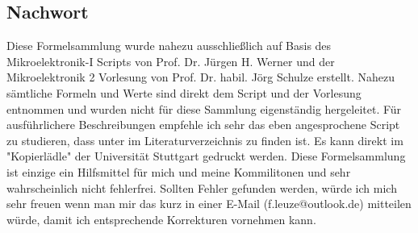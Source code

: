 \documentclass[12pt,a4paper]{article}%
\numberwithin{equation}{section}
\numberwithin{equation}{subsection}
\begin{document}
  \newpage
  \subsection{Nachwort}
  Diese Formelsammlung wurde nahezu ausschließlich auf Basis des Mikroelektronik-I Scripts von Prof. Dr. Jürgen H. Werner und der Mikroelektronik 2 Vorlesung von Prof. Dr. habil. Jörg Schulze erstellt. Nahezu sämtliche Formeln und Werte sind direkt dem Script und der Vorlesung entnommen und wurden nicht für diese Sammlung eigenständig hergeleitet. Für ausführlichere Beschreibungen empfehle ich sehr das eben angesprochene Script zu studieren, dass unter \cite{Mikro1} im Literaturverzeichnis zu finden ist. Es kann direkt im "Kopierlädle" der Universität Stuttgart gedruckt werden. Diese Formelsammlung ist einzige ein Hilfsmittel für mich und meine Kommilitonen und sehr wahrscheinlich nicht fehlerfrei. Sollten Fehler gefunden werden, würde ich mich sehr freuen wenn man mir das kurz in einer E-Mail (f.leuze@outlook.de) mitteilen würde, damit ich entsprechende Korrekturen vornehmen kann. 
  

\end{document}
